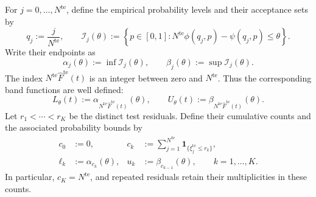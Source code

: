 \documentclass[review,11pt,3p,authoryear,nopreprintline]{elsarticle}
\begin{document}
For $j=0,\ldots,N^{\mathrm{te}}$, define the empirical probability levels and their acceptance sets by
\begin{equation}
  q_j:=\frac{j}{N^{\mathrm{te}}},\qquad
  \mathcal I_j(\theta):=
  \left\{p\in[0,1]:
  N^{\mathrm{te}}\phi\left(q_j,p\right)-\psi\left(q_j,p\right)\le\theta\right\}.
  \label{eq-dw-rank-acceptance}
\end{equation}
Write their endpoints as
\begin{equation}
  \alpha_j(\theta):=\inf\mathcal I_j(\theta),\qquad
  \beta_j(\theta):=\sup\mathcal I_j(\theta).
  \label{eq-dw-rank-endpoints}
\end{equation}
The index $N^{\mathrm{te}}\widehat F^{\mathrm{te}}(t)$ is an integer between zero and $N^{\mathrm{te}}$. Thus the corresponding band functions are well defined:
\begin{equation}
  L_\theta(t):=\alpha_{N^{\mathrm{te}}\widehat F^{\mathrm{te}}(t)}(\theta),\qquad
  U_\theta(t):=\beta_{N^{\mathrm{te}}\widehat F^{\mathrm{te}}(t)}(\theta).
  \label{eq-dw-band-functions}
\end{equation}
Let $r_1<\cdots<r_K$ be the distinct test residuals. Define their cumulative counts and the associated probability bounds by
\begin{equation}
  \begin{aligned}
    c_0&:=0,&
    c_k&:=\sum_{j=1}^{N^{\mathrm{te}}}\mathbf1_{\{\xi_j^{\mathrm{te}}\le r_k\}},\\
    \ell_k&:=\alpha_{c_k}(\theta),&
    u_k&:=\beta_{c_{k-1}}(\theta),\qquad k=1,\ldots,K.
  \end{aligned}
  \label{eq-dw-counts-and-levels}
\end{equation}
In particular, $c_K=N^{\mathrm{te}}$, and repeated residuals retain their multiplicities in these counts.
\end{document}
